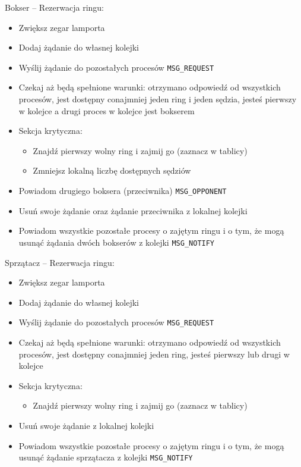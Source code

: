 \documentclass{article}
\begin{document}
Bokser -- Rezerwacja ringu:
\begin{itemize}
    \item Zwiększ zegar lamporta
    \item Dodaj żądanie do własnej kolejki
    \item Wyślij żądanie do pozostałych procesów \verb|MSG_REQUEST|
    \item Czekaj aż będą spełnione warunki: otrzymano odpowiedź od
    wszystkich procesów, jest dostępny conajmniej jeden ring i jeden
    sędzia, jesteś pierwszy w kolejce a drugi proces w kolejce jest
    bokserem
    \item Sekcja krytyczna:
    \begin{itemize}
        \item Znajdź pierwszy wolny ring i zajmij go (zaznacz w tablicy)
        \item Zmniejsz lokalną liczbę dostępnych sędziów
    \end{itemize}
    \item Powiadom drugiego boksera (przeciwnika) \verb|MSG_OPPONENT|
    \item Usuń swoje żądanie oraz żądanie przeciwnika z lokalnej kolejki
    \item Powiadom wszystkie pozostałe procesy o zajętym ringu i o tym,
    że mogą usunąć żądania dwóch bokserów z kolejki \verb|MSG_NOTIFY|
\end{itemize}

Sprzątacz -- Rezerwacja ringu:
\begin{itemize}
    \item Zwiększ zegar lamporta
    \item Dodaj żądanie do własnej kolejki
    \item Wyślij żądanie do pozostałych procesów \verb|MSG_REQUEST|
    \item Czekaj aż będą spełnione warunki: otrzymano odpowiedź od
    wszystkich procesów, jest dostępny conajmniej jeden ring, jesteś
    pierwszy lub drugi w kolejce
    \item Sekcja krytyczna:
    \begin{itemize}
        \item Znajdź pierwszy wolny ring i zajmij go (zaznacz w tablicy)
    \end{itemize}
    \item Usuń swoje żądanie z lokalnej kolejki
    \item Powiadom wszystkie pozostałe procesy o zajętym ringu i o tym,
    że mogą usunąć żądanie sprzątacza z kolejki \verb|MSG_NOTIFY|
\end{itemize}
\end{document}

